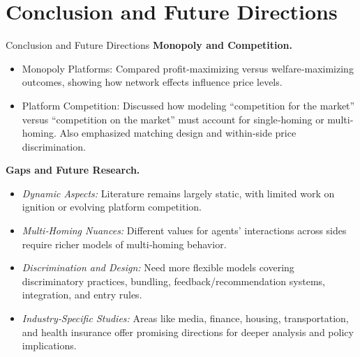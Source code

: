 \documentclass[aspectratio=169]{beamer}  %
\begin{document}
\section{Conclusion and Future Directions}
\begin{frame}{Conclusion and Future Directions}
    \justifying  %
    \textbf{Monopoly and Competition.}
    \begin{itemize}
      \item Monopoly Platforms: Compared profit‐maximizing versus welfare‐maximizing 
            outcomes, showing how network effects influence price levels.
      \item Platform Competition: Discussed how modeling “competition for the market” versus 
            “competition on the market” must account for single‐homing or multi‐homing. 
            Also emphasized matching design and within‐side price discrimination.
    \end{itemize}
\end{frame}

\begin{frame}
    \textbf{Gaps and Future Research.}
    \begin{itemize}
      \item \emph{Dynamic Aspects:} Literature remains largely static, with limited work on ignition 
            or evolving platform competition.
      \item \emph{Multi‐Homing Nuances:} Different values for agents’ interactions across sides 
            require richer models of multi‐homing behavior.
      \item \emph{Discrimination and Design:} Need more flexible models covering discriminatory 
            practices, bundling, feedback/recommendation systems, integration, and entry rules.
      \item \emph{Industry‐Specific Studies:} Areas like media, finance, housing, transportation, 
            and health insurance offer promising directions for deeper analysis and policy implications.
    \end{itemize}
\end{frame}
\end{document}
